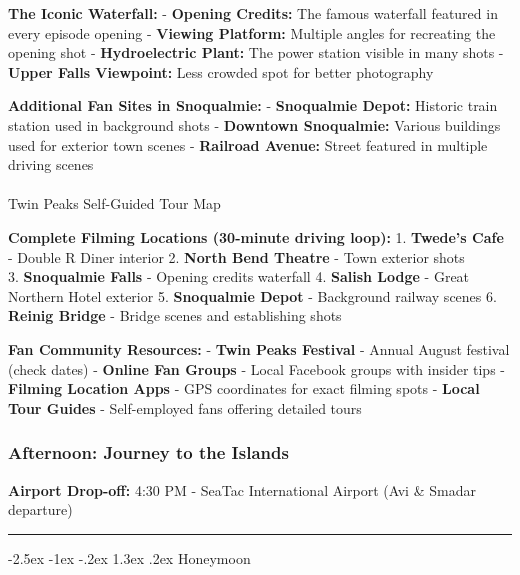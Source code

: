 \documentclass[
  11pt,
  letterpaper,
  DIV=10,
  numbers=noendperiod]{scrartcl}
\makeatletter
\let\oldparagraph\paragraph
\renewcommand{\paragraph}{
    \@ifstar
      \xxxParagraphStar
      \xxxParagraphNoStar
  }
\newcommand{\xxxParagraphStar}[1]{\oldparagraph*{#1}\mbox{}}
\newcommand{\xxxParagraphNoStar}[1]{\oldparagraph{#1}\mbox{}}
\renewcommand{\section}{\@startsection{section}{1}{\z@}%
  {-2.5ex \@plus -1ex \@minus -.2ex}%
  {1.3ex \@plus .2ex}%
  {\normalfont\fontsize{16}{19}\bfseries\color{twinpeaksred}}}
\makeatother
\begin{document}
\textbf{The Iconic Waterfall:} - \textbf{Opening Credits:} The famous
waterfall featured in every episode opening - \textbf{Viewing Platform:}
Multiple angles for recreating the opening shot - \textbf{Hydroelectric
Plant:} The power station visible in many shots - \textbf{Upper Falls
Viewpoint:} Less crowded spot for better photography

\textbf{Additional Fan Sites in Snoqualmie:} - \textbf{Snoqualmie
Depot:} Historic train station used in background shots -
\textbf{Downtown Snoqualmie:} Various buildings used for exterior town
scenes - \textbf{Railroad Avenue:} Street featured in multiple driving
scenes

\paragraph{Twin Peaks Self-Guided Tour
Map}\label{twin-peaks-self-guided-tour-map}

\textbf{Complete Filming Locations (30-minute driving loop):} 1.
\textbf{Twede's Cafe} - Double R Diner interior 2. \textbf{North Bend
Theatre} - Town exterior shots\\
3. \textbf{Snoqualmie Falls} - Opening credits waterfall 4.
\textbf{Salish Lodge} - Great Northern Hotel exterior 5.
\textbf{Snoqualmie Depot} - Background railway scenes 6. \textbf{Reinig
Bridge} - Bridge scenes and establishing shots

\textbf{Fan Community Resources:} - \textbf{Twin Peaks Festival} -
Annual August festival (check dates) - \textbf{Online Fan Groups} -
Local Facebook groups with insider tips - \textbf{Filming Location Apps}
- GPS coordinates for exact filming spots - \textbf{Local Tour Guides} -
Self-employed fans offering detailed tours

\subsubsection{Afternoon: Journey to the
Islands}\label{afternoon-journey-to-the-islands}

\textbf{Airport Drop-off:} 4:30 PM - SeaTac International Airport (Avi
\& Smadar departure)

\begin{center}\rule{0.5\linewidth}{0.5pt}\end{center}

\section{Honeymoon}\label{honeymoon}
\end{document}
